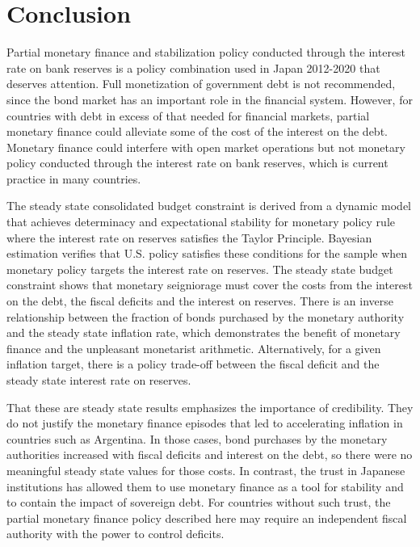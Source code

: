 \documentclass[]{article}
\begin{document}
\section{Conclusion}

Partial monetary finance and stabilization policy conducted through the interest rate on bank reserves is a policy combination used in Japan 2012-2020 that deserves attention. Full monetization of government debt is not recommended, since the bond market has an important role in the financial system. However, for countries with debt in excess of that needed for financial markets, partial monetary finance could alleviate some of the cost of the interest on the debt. Monetary finance could interfere with open market operations but  not monetary policy conducted through the interest rate on bank reserves, which is current practice in many countries.

The steady state consolidated budget constraint is derived from a dynamic model that achieves determinacy and expectational stability for monetary policy rule where the interest rate on reserves satisfies the Taylor Principle. Bayesian estimation verifies that U.S. policy satisfies these conditions for the sample when monetary policy targets the interest rate on reserves. The steady state budget constraint shows that monetary seigniorage must cover the costs from the interest on the debt, the fiscal deficits and the interest on reserves. There is an inverse relationship between the fraction of bonds purchased by the monetary authority and the steady state inflation rate, which demonstrates the benefit of monetary finance and the unpleasant monetarist arithmetic. Alternatively, for a given inflation target, there is a policy trade-off between the fiscal deficit and the steady state interest rate on reserves.

That these are steady state results emphasizes the importance of credibility. They do not justify the monetary finance episodes that led to accelerating inflation in countries such as Argentina. In those cases, bond purchases by the monetary authorities increased with fiscal deficits and interest on the debt, so there were no meaningful steady state values for those costs. In contrast, the trust in Japanese institutions has allowed them to use monetary finance as a tool for stability and to contain the impact of sovereign debt. For countries without such trust, the partial monetary finance policy described here may require an independent fiscal authority with the power to control deficits.
\end{document}
